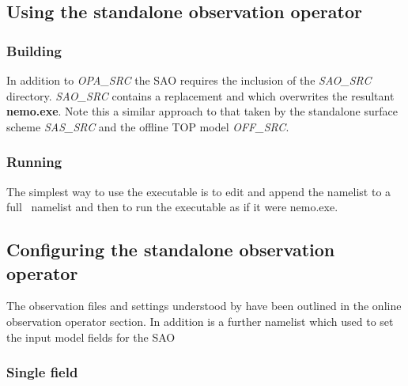 \documentclass[../main/NEMO_manual]{subfiles}
\begin{document}

\subsection{Using the standalone observation operator}

\subsubsection{Building}

In addition to \emph{OPA\_SRC} the SAO requires the inclusion of the \emph{SAO\_SRC} directory.
\emph{SAO\_SRC} contains a replacement  and  which
overwrites the resultant \textbf{nemo.exe}.
Note this a similar approach to that taken by the standalone surface scheme \emph{SAS\_SRC} and the offline TOP model \emph{OFF\_SRC}.

\subsubsection{Running}

The simplest way to use the executable is to edit and append the  namelist to
a full \NEMO\ namelist and then to run the executable as if it were nemo.exe.

\subsection{Configuring the standalone observation operator}
The observation files and settings understood by  have been outlined in the online observation operator section.
In addition is a further namelist  which used to set the input model fields for the SAO

\subsubsection{Single field}
\end{document}
